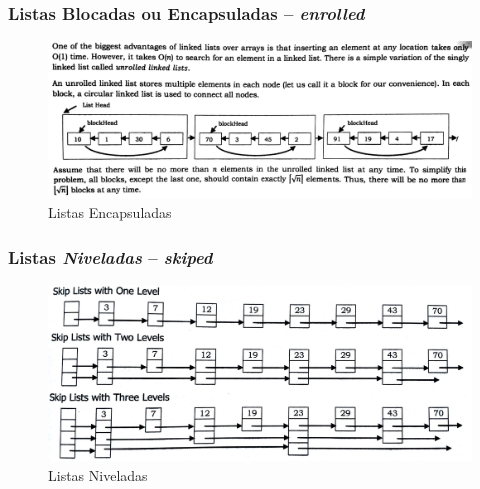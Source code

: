 \begin{frame}%

\frametitle{Listas Blocadas ou Encapsuladas -- \textit{enrolled}}

\begin{figure}[!hb]
	\centering
	\includegraphics[height=0.60\paperheight, width=0.9\paperwidth]{figs/fig_listas/unrolled_listas.jpg}						
			\caption{Listas Encapsuladas}	
		\end{figure} 

\end{frame} 


\begin{frame}%

\frametitle{Listas \textit{Niveladas} -- \textit{skiped}}

\begin{figure}[!hb]
	\centering
	\includegraphics[height=0.50\paperheight, width=0.7\paperwidth]{figs/fig_listas/skipped_listas.jpg}						
			\caption{Listas Niveladas}	
		\end{figure} 

\end{frame} 




